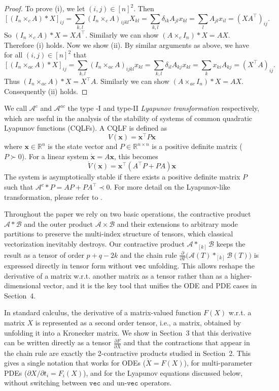 \documentclass[11pt, oneside]{article}  %
\newcommand{\partl}{\partial}
\newcommand{\vecc}{\texttt{vec}}
\newcommand{\RR}{\mathbb{R}}
\newcommand{\A}{\mathcal{A}}
\newcommand{\B}{\mathcal{B}}
\newcommand{\bx}{\textbf{x}}
\newcommand{\beq}{\begin{equation}}
\newcommand{\eeq}{\end{equation}}
\begin{document}
\begin{proof}
To prove (i), we let $(i,j)\in [n]^{2}$. Then 
\[
\left[(I_{n}\times_{c} A)\ast X\right]_{ij}=\sum_{k,l} (I_{n}\times_{c}A)_{ijkl} X_{kl} = \sum_{k,l} \delta_{ik} A_{jl} x_{kl}
=\sum_{l} A_{jl}x_{il}= (XA^{\top})_{ij}.
\]
So $(I_{n}\times_{c} A)\ast X = XA^{\top}$.  Similarly we can show $(A\times_{c} I_{n})\ast X = AX$.  Therefore (i) holds.   
Now we show (ii).  By similar arguments as above, we have for all $(i,j)\in [n]^{2}$ that 
\[ 
\left[(I_{n}\times_{ac} A)\ast X \right]_{ij}=\sum_{k,l} (I_{n}\times_{ac}A)_{ijkl} x_{kl} = \sum_{k,l} \delta_{il} A_{kj} x_{kl}
=\sum_{k} x_{ki}A_{kj} = (X^{\top}A)_{ij}.
\]
Thus $(I_{n}\times_{ac} A)\ast X = X^{\top}A$. Similarly we can show $(A\times_{ac} I_{n}) \ast X = AX$.  Consequently (ii) holds.  
\end{proof}

We call $\A^{c}$ and $\A^{ac}$ the type -I and type-II \emph{Lyapunov transformation} respectively, which are useful in the analysis of the 
stability of systems of common quadratic Lyapunov functions (CQLFs).  A CQLF is defined as 
\beq\label{eq2-3-3} 
V(\bx) = \bx^{\top}P \bx
\eeq 
where $\bx\in\RR^n$ is the state vector and $P\in\RR^{n\times n}$ is a positive definite matrix ($P\succ 0$).  For a linear system 
$\dot{\bx}=A\bx$, this becomes
\beq\label{eq2-3-4} 
\dot{V}(\bx) = \bx^\top (A^\top P + P A) \bx 
\eeq
The system is asymptotically stable if there exists a positive definite matrix $P$ such that $\A^{c}\ast P = AP + PA^{\top}\prec 0$.  For more detail on the Lyapunov-like transformation, please refer to \cite{BGFB1994}.    

Throughout the paper we rely on two basic operations, the contractive product $\A\ast\B$ and the outer product $\A\times\B$ and their extensions 
to arbitrary mode partitions to preserve the multi-index structure of tensors, which classical vectorization inevitably destroys. Our contractive 
product $\A\ast_{[k]}\B$ keeps the result as a tensor of order $p+q-2k$ and the chain rule $\frac{\partl}{\partl T}\bigl(\A(T)\ast_{[k]}\B(T)\bigr)$
is expressed directly in tensor form without $\vecc$ unfolding.  This allows reshape the derivative of a matrix w.r.t. another matrix as a tensor rather 
than as a higher-dimensional vector, and it is the key tool that unifies the ODE and PDE cases in Section~4.  

In standard calculus, the derivative of a matrix-valued function $F(X)$ w.r.t. a matrix $X$ is represented as a second order tensor, i.e., a matrix, 
obtained by unfolding it into a Kronecker matrix.  We show in Section~3 that this derivative can be written directly as a tensor $\frac{\partl F}{\partl X}$ and that the contractions that appear in the chain rule are exactly the 2-contractive products studied in Section~2.  This gives a single
notation that works for ODEs ($\dot{X}=F(X)$), for multi-parameter PDEs ($\partial X/\partial t_{i}=F_{i}(X)$), and for the Lyapunov equations 
discussed below, without switching between $\vecc$ and un-$\vecc$ operators.
\end{document}

